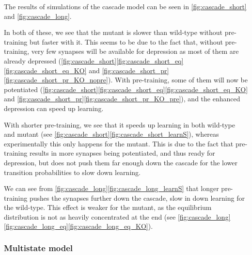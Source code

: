 \documentclass[12pt]{article}
\begin{document}
The results of simulations of the cascade model can be seen in \autoref{fig:cascade_short} and \autoref{fig:cascade_long}.

In both of these, we see that the mutant is slower than wild-type without pre-training but faster with it.
This seems to be due to the fact that, without pre-training, very few synapses will be available for depression as most of them are already depressed (\autoref{fig:cascade_short}\ref{fig:cascade_short_eq}\ref{fig:cascade_short_eq_KO} and \ref{fig:cascade_short_pr}\ref{fig:cascade_short_pr_KO_nopre}).
With pre-training, some of them will now be potentiated (\autoref{fig:cascade_short}\ref{fig:cascade_short_eq}\ref{fig:cascade_short_eq_KO} and \ref{fig:cascade_short_pr}\ref{fig:cascade_short_pr_KO_pre}), and the enhanced depression can speed up learning.

With shorter pre-training, we see that it speeds up learning in both wild-type and mutant (see \autoref{fig:cascade_short}\ref{fig:cascade_short_learnS}), whereas experimentally this only happens for the mutant.
This is due to the fact that pre-training results in more synapses being potentiated, and thus ready for depression, but does not push them far enough down the cascade for the lower transition probabilities to slow down learning.

We can see from \autoref{fig:cascade_long}\ref{fig:cascade_long_learnS} that longer pre-training pushes the synapses further down the cascade, slow in down learning for the wild-type.
This effect is weaker for the mutant, as the equilibrium distribution is not as heavily concentrated at the end (see \autoref{fig:cascade_long}\ref{fig:cascade_long_eq}\ref{fig:cascade_long_eq_KO}).


\subsubsection{Multistate model}\label{sec:multistate}
\end{document}
